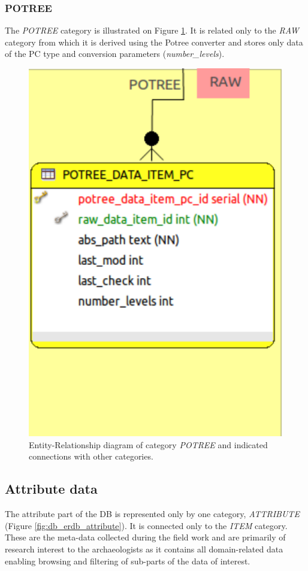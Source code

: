 \subsubsection{POTREE}
The {\em POTREE} category is illustrated on Figure \ref{fig:db_erdb_potree}. It
is related only to the {\em RAW} category from which it is derived using the Potree
converter and stores only data of the PC type and conversion parameters ({\em number\_levels}).

\begin{figure}[H]
\centering
\includegraphics[scale=0.35]{fig/database/ERDB_POTREE_conn.pdf}
\caption{Entity-Relationship diagram of category {\em POTREE} and indicated
connections with other categories.}
\label{fig:db_erdb_potree}
\end{figure}

\subsection{Attribute data}
The attribute part of the DB is represented only by one category, {\em ATTRIBUTE}
(Figure \ref{fig:db_erdb_attribute}). It is connected only to the {\em ITEM} category.
These are the meta-data collected during the field work and are primarily of research
interest to the archaeologists as it contains all domain-related data enabling browsing
and filtering of sub-parts of the data of interest.

